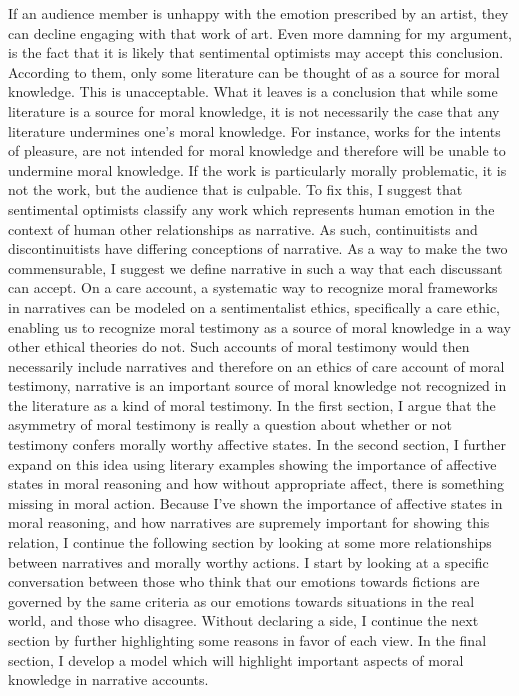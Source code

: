 \documentclass[
  letterpaper,
  DIV=11,
  numbers=noendperiod]{scrartcl}
\theoremstyle{remark}
\begin{document}
If an audience member is unhappy with the emotion prescribed by an
artist, they can decline engaging with that work of art. Even more
damning for my argument, is the fact that it is likely that sentimental
optimists may accept this conclusion. According to them, only some
literature can be thought of as a source for moral knowledge. This is
unacceptable. What it leaves is a conclusion that while some literature
is a source for moral knowledge, it is not necessarily the case that any
literature undermines one's moral knowledge. For instance, works for the
intents of pleasure, are not intended for moral knowledge and therefore
will be unable to undermine moral knowledge. If the work is particularly
morally problematic, it is not the work, but the audience that is
culpable. To fix this, I suggest that sentimental optimists classify any
work which represents human emotion in the context of human other
relationships as narrative. As such, continuitists and discontinuitists
have differing conceptions of narrative. As a way to make the two
commensurable, I suggest we define narrative in such a way that each
discussant can accept. On a care account, a systematic way to recognize
moral frameworks in narratives can be modeled on a sentimentalist
ethics, specifically a care ethic, enabling us to recognize moral
testimony as a source of moral knowledge in a way other ethical theories
do not. Such accounts of moral testimony would then necessarily include
narratives and therefore on an ethics of care account of moral
testimony, narrative is an important source of moral knowledge not
recognized in the literature as a kind of moral testimony. In the first
section, I argue that the asymmetry of moral testimony is really a
question about whether or not testimony confers morally worthy affective
states. In the second section, I further expand on this idea using
literary examples showing the importance of affective states in moral
reasoning and how without appropriate affect, there is something missing
in moral action. Because I've shown the importance of affective states
in moral reasoning, and how narratives are supremely important for
showing this relation, I continue the following section by looking at
some more relationships between narratives and morally worthy actions. I
start by looking at a specific conversation between those who think that
our emotions towards fictions are governed by the same criteria as our
emotions towards situations in the real world, and those who disagree.
Without declaring a side, I continue the next section by further
highlighting some reasons in favor of each view. In the final section, I
develop a model which will highlight important aspects of moral
knowledge in narrative accounts.
\end{document}
